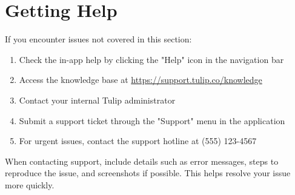 \documentclass[12pt,a4paper]{report}
\newenvironment{note}
  {\begin{tcolorbox}[colback=tuliplightgray,colframe=tulipblue,title=Note]}
  {\end{tcolorbox}}
\begin{document}
\section{Getting Help}

If you encounter issues not covered in this section:

\begin{enumerate}
    \item Check the in-app help by clicking the "Help" icon in the navigation bar
    \item Access the knowledge base at \url{https://support.tulip.co/knowledge}
    \item Contact your internal Tulip administrator
    \item Submit a support ticket through the "Support" menu in the application
    \item For urgent issues, contact the support hotline at (555) 123-4567
\end{enumerate}

\begin{note}
When contacting support, include details such as error messages, steps to reproduce the issue, and screenshots if possible. This helps resolve your issue more quickly.
\end{note}
\end{document}
